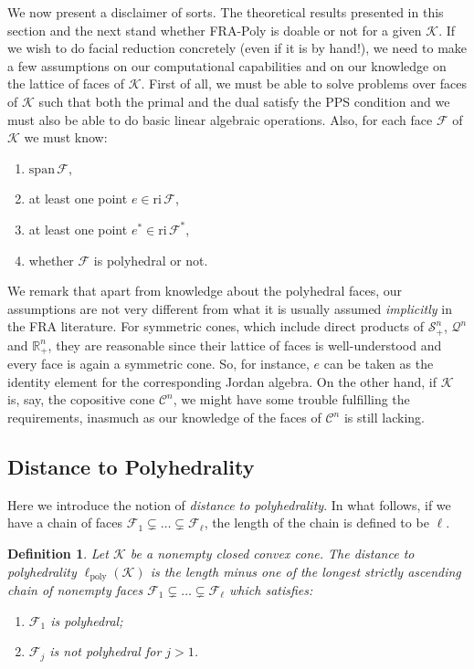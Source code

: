\documentclass{article}
\newcommand{\SOC}[1]{{\mathcal{Q}^{#1}}}
\newcommand{\reInt}{\mathrm{ri}\,}
\newcommand{\spanVec}{\mathrm{span}\,}
\newcommand{\PSDcone}[1]{{\mathcal{S}^{#1}_+}}
\newcommand{\stdCone}{ {\mathcal{K}}}
\newcommand{\stdFace}{ \mathcal{F}}
\newcommand{\stdInt}{ {e}}
\renewcommand{\Re}{\mathbb{R}}
\newcommand{\distP}{\ell _{\text{poly}}}
\newcommand{\PPS}{{PPS}}
\newtheorem{definition}{Definition}
\begin{document}
We now present a disclaimer of sorts.
The theoretical results presented in this section and the next stand whether FRA-Poly is doable or 
not for a given $\stdCone$. 
If we wish to do facial reduction concretely (even if it is by hand!), we need to 
make a few assumptions on our computational capabilities 
and on our knowledge on the lattice of faces of $\stdCone$. 
First of all, we must be able to solve problems over faces of $\stdCone$ such that both the primal and the dual 
satisfy the {\PPS} condition and we must also be able to do 
basic linear algebraic operations.  Also, for 
each face $\stdFace$ of $\stdCone$ we must know:
\begin{enumerate}
	\item $\spanVec \stdFace$, 
	\item at least one point $\stdInt \in \reInt \stdFace$,
	\item at least one point $\stdInt^* \in \reInt \stdFace^*$,
	\item whether $\stdFace$ is polyhedral or not.
\end{enumerate}
We remark that 
apart from  knowledge about the polyhedral faces, our assumptions are not very different from what it is 
usually assumed \emph{implicitly} in the FRA literature. 
For symmetric cones, which 
include direct products of $\PSDcone{n}$, $\SOC{n}$ and $\Re^n_+$, they are reasonable since their 
lattice of faces is well-understood and every face is again a symmetric cone. 
So, for instance, $\stdInt$ can be taken as the identity element for 
the corresponding Jordan algebra. On the other hand, if $\stdCone$ is, say, the copositive 
cone $\mathcal{C}^n$, we might have some trouble fulfilling the requirements, inasmuch  as our knowledge of 
the faces of $\mathcal{C}^n$ is still lacking.

\subsection{Distance to Polyhedrality}
Here we introduce the notion of \emph{distance to polyhedrality}. In what follows, 
if we have a chain of faces $\stdFace _1 \subsetneq \ldots \subsetneq \stdFace _\ell$, the 
length of the chain is defined to be $\ell$.
\begin{definition}
	Let $\stdCone$ be a nonempty closed convex cone. The \emph{distance to polyhedrality} $\distP(\stdCone)$ is the 
	length \emph{minus one} of the longest strictly ascending chain of nonempty faces $\stdFace _1 \subsetneq \ldots \subsetneq \stdFace _{\ell} $ which satisfies:
	\begin{enumerate}
		\item  $\stdFace _1$ is polyhedral;  
		\item $\stdFace _j$ is not polyhedral for $j > 1$.
	\end{enumerate}
\end{definition}
\end{document}
